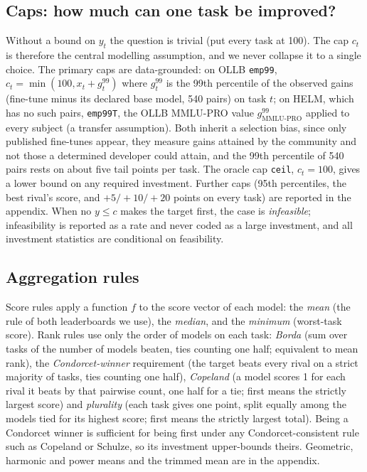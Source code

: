 \documentclass{article}
\begin{document}
\subsection{Caps: how much can one task be improved?}
\label{sec:caps}
Without a bound on $y_t$ the question is trivial (put every task at 100). The cap $c_t$ is therefore the central modelling assumption, and we never collapse it to a single choice. The primary caps are data-grounded: on OLLB \texttt{emp99}, $c_t=\min(100,x_t+g_t^{99})$ where $g_t^{99}$ is the 99th percentile of the observed gains (fine-tune minus its declared base model, 540 pairs) on task $t$; on HELM, which has no such pairs, \texttt{emp99T}, the OLLB MMLU-PRO value $g^{99}_{\text{MMLU-PRO}}$ applied to every subject (a transfer assumption). Both inherit a selection bias, since only published fine-tunes appear, they measure gains attained by the community and not those a determined developer could attain, and the 99th percentile of 540 pairs rests on about five tail points per task. The oracle cap \texttt{ceil}, $c_t=100$, gives a lower bound on any required investment. Further caps (95th percentiles, the best rival's score, and $+5/+10/+20$ points on every task) are reported in the appendix. When no $y\le c$ makes the target first, the case is \emph{infeasible}; infeasibility is reported as a rate and never coded as a large investment, and all investment statistics are conditional on feasibility.

\subsection{Aggregation rules}
\label{sec:rules}
Score rules apply a function $f$ to the score vector of each model: the \emph{mean} (the rule of both leaderboards we use), the \emph{median}, and the \emph{minimum} (worst-task score). Rank rules use only the order of models on each task: \emph{Borda} (sum over tasks of the number of models beaten, ties counting one half; equivalent to mean rank), the \emph{Condorcet-winner} requirement (the target beats every rival on a strict majority of tasks, ties counting one half), \emph{Copeland} (a model scores 1 for each rival it beats by that pairwise count, one half for a tie; first means the strictly largest score) and \emph{plurality} (each task gives one point, split equally among the models tied for its highest score; first means the strictly largest total). Being a Condorcet winner is sufficient for being first under any Condorcet-consistent rule such as Copeland or Schulze, so its investment upper-bounds theirs. Geometric, harmonic and power means and the trimmed mean are in the appendix.
\end{document}
